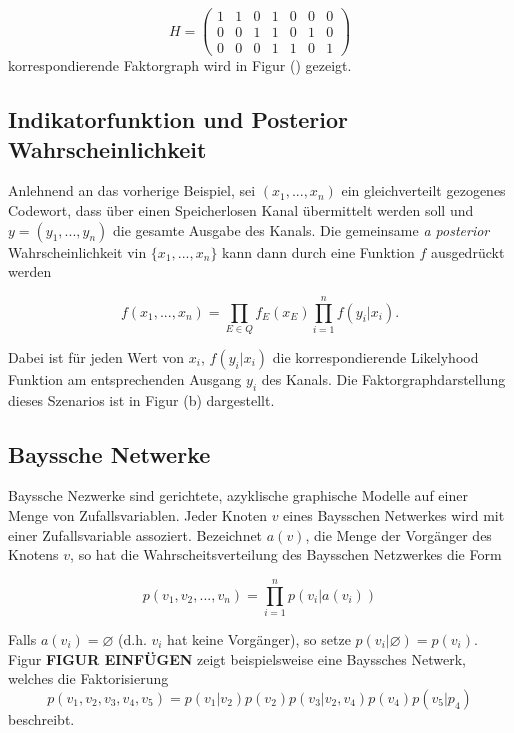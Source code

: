 \documentclass[12pt,a4paper]{scrartcl}
\numberwithin{equation}{section}
\begin{document}
\begin{equation}
H =
  \begin{pmatrix}
  1 & 1 & 0 & 1 & 0 & 0 & 0  \\
  0 & 0 & 1 & 1 & 0 & 1 & 0  \\
  0 & 0 & 0 & 1 & 1 & 0 & 1 	
 
 \end{pmatrix}
\end{equation}
korrespondierende Faktorgraph wird in Figur () gezeigt.

\subsection{Indikatorfunktion und Posterior Wahrscheinlichkeit}

Anlehnend an das vorherige Beispiel, sei $(x_1,...,x_n)$ ein gleichverteilt gezogenes Codewort, dass über einen Speicherlosen Kanal 
übermittelt werden soll und $y = (y_1,...,y_n)$ die gesamte Ausgabe des Kanals. Die gemeinsame \textit{a posterior} Wahrscheinlichkeit
vin $\{x_1,...,x_n\}$ kann dann durch eine Funktion $f$ ausgedrückt werden

\begin{equation}
 f(x_1,...,x_n) = \prod_{E \in Q} f_E(x_E) \prod_{i=1}^n f(y_i|x_i).
\end{equation}

Dabei ist für jeden Wert von $x_i$, $f(y_i|x_i)$ die korrespondierende Likelyhood Funktion am entsprechenden Ausgang $y_i$ des Kanals.
Die Faktorgraphdarstellung dieses Szenarios ist in Figur (b) dargestellt.  

\subsection{Bayssche Netwerke}

Bayssche Nezwerke sind gerichtete, azyklische graphische Modelle auf einer Menge von Zufallsvariablen. 
Jeder Knoten $v$ eines Baysschen Netwerkes wird mit einer Zufallsvariable assoziert. Bezeichnet $a(v)$, die Menge
der Vorgänger des Knotens $v$, so hat die Wahrscheitsverteilung des Baysschen Netzwerkes die Form

\begin{equation}
 p(v_{1},v_{2},...,v_{n}) = \prod_{i=1}^n p(v_{i}|a(v_i))
\end{equation}

Falls $a(v_i) = \varnothing $ (d.h. $v_i$ hat keine Vorgänger), so setze $p(v_i| \varnothing) = p(v_i)$.
Figur \textbf{FIGUR EINFÜGEN} zeigt beispielsweise eine Bayssches Netwerk, welches die Faktorisierung 
$$
p(v_1,v_2,v_3,v_4,v_5) = p(v_1|v_2)p(v_2)p(v_3|v_2,v_4)p(v_4)p(v_5|p_4)
$$
beschreibt. 
\end{document}
